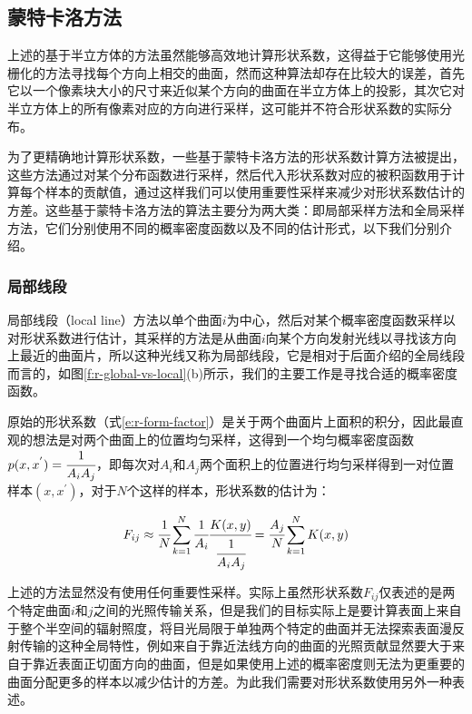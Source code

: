\subsection{蒙特卡洛方法}\label{sec:r-mc-radiosity}
上述的基于半立方体的方法虽然能够高效地计算形状系数，这得益于它能够使用光栅化的方法寻找每个方向上相交的曲面，然而这种算法却存在比较大的误差，首先它以一个像素块大小的尺寸来近似某个方向的曲面在半立方体上的投影，其次它对半立方体上的所有像素对应的方向进行采样，这可能并不符合形状系数的实际分布。

为了更精确地计算形状系数，一些基于蒙特卡洛方法的形状系数计算方法被提出，这些方法通过对某个分布函数进行采样，然后代入形状系数对应的被积函数用于计算每个样本的贡献值，通过这样我们可以使用重要性采样来减少对形状系数估计的方差。这些基于蒙特卡洛方法的算法主要分为两大类：即局部采样方法和全局采样方法，它们分别使用不同的概率密度函数以及不同的估计形式，以下我们分别介绍。





\subsubsection{局部线段}
局部线段（local line）方法\cite{a:AGeneralTwoPassMethodIntegratingSpecularandDiffuseReflection,a:ARayTracingMethodforIlluminationCalculationinDiffuse-SpecularScenes}以单个曲面$i$为中心，然后对某个概率密度函数采样以对形状系数进行估计，其采样的方法是从曲面$i$向某个方向发射光线以寻找该方向上最近的曲面片，所以这种光线又称为局部线段，它是相对于后面介绍的全局线段而言的，如图\ref{f:r-global-vs-local}(b)所示，我们的主要工作是寻找合适的概率密度函数。

原始的形状系数（式\ref{e:r-form-factor}）是关于两个曲面片上面积的积分，因此最直观的想法是对两个曲面上的位置均匀采样，这得到一个均匀概率密度函数$p(x,x^{'})= \cfrac{1}{A_iA_j}$，即每次对$A_i$和$A_j$两个面积上的位置进行均匀采样得到一对位置样本$(x,x^{'})$，对于$N$个这样的样本，形状系数的估计为：

\begin{equation}
	F_{ij}\approx \cfrac{1}{N}\sum^{N}_{k=1} \cfrac{1}{A_i} \cfrac{K(x,y)}{ \cfrac{1}{A_iA_j}}= \cfrac{A_j}{N}\sum^{N}_{k=1}K(x,y)
\end{equation}

上述的方法显然没有使用任何重要性采样。实际上虽然形状系数$F_{ij}$仅表述的是两个特定曲面$i$和$j$之间的光照传输关系，但是我们的目标实际上是要计算表面上来自于整个半空间的辐射照度，将目光局限于单独两个特定的曲面并无法探索表面漫反射传输的这种全局特性，例如来自于靠近法线方向的曲面的光照贡献显然要大于来自于靠近表面正切面方向的曲面，但是如果使用上述的概率密度则无法为更重要的曲面分配更多的样本以减少估计的方差。为此我们需要对形状系数使用另外一种表述。

